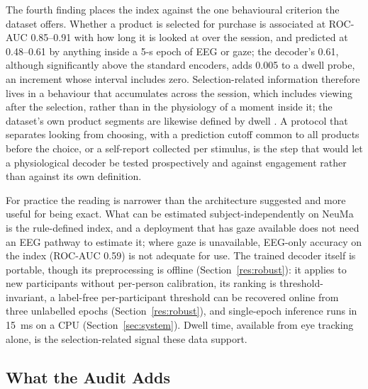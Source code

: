 \documentclass[pdflatex,sn-basic,Numbered,twocolumn,iicol]{sn-jnl}
\theoremstyle{thmstyleone}%
\theoremstyle{thmstyletwo}%
\theoremstyle{thmstylethree}%
\begin{document}
The fourth finding places the index against the one behavioural criterion the dataset offers. Whether a product is selected for purchase is associated at ROC-AUC 0.85--0.91 with how long it is looked at over the session, and predicted at 0.48--0.61 by anything inside a 5-s epoch of EEG or gaze; the decoder's 0.61, although significantly above the standard encoders, adds 0.005 to a dwell probe, an increment whose interval includes zero. Selection-related information therefore lives in a behaviour that accumulates across the session, which includes viewing after the selection, rather than in the physiology of a moment inside it; the dataset's own product segments are likewise defined by dwell \cite{ref35}. A protocol that separates looking from choosing, with a prediction cutoff common to all products before the choice, or a self-report collected per stimulus, is the step that would let a physiological decoder be tested prospectively and against engagement rather than against its own definition.

For practice the reading is narrower than the architecture suggested and more useful for being exact. What can be estimated subject-independently on NeuMa is the rule-defined index, and a deployment that has gaze available does not need an EEG pathway to estimate it; where gaze is unavailable, EEG-only accuracy on the index (ROC-AUC 0.59) is not adequate for use. The trained decoder itself is portable, though its preprocessing is offline (Section~\ref{res:robust}): it applies to new participants without per-person calibration, its ranking is threshold-invariant, a label-free per-participant threshold can be recovered online from three unlabelled epochs (Section~\ref{res:robust}), and single-epoch inference runs in 15~ms on a CPU (Section~\ref{sec:system}). Dwell time, available from eye tracking alone, is the selection-related signal these data support.

\subsection{What the Audit Adds}\label{disc:protocol}
\end{document}
